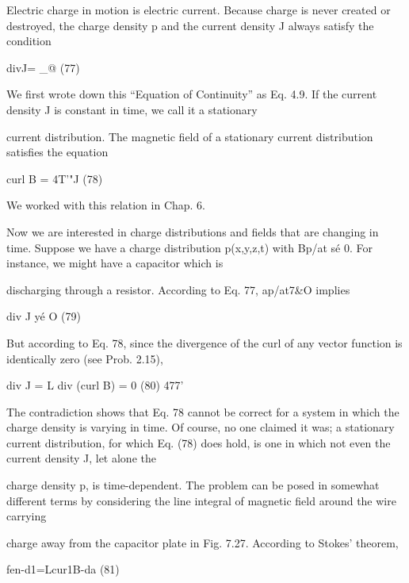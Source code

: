 Electric charge in motion is electric current. Because charge is
never created or destroyed, the charge density p and the current
density J always satisfy the condition

\begin{equation}
\end{equation}
divJ= _@ (77)

We first wrote down this ``Equation of Continuity'' as Eq. 4.9.
If the current density J is constant in time, we call it a stationary

current distribution. The magnetic field of a stationary current distribution
satisfies the equation

\begin{equation}
\end{equation}
curl B = 4T'"J (78)

We worked with this relation in Chap. 6.

Now we are interested in charge distributions and fields that are
changing in time. Suppose we have a charge distribution p(x,y,z,t)
with Bp/at sé 0. For instance, we might have a capacitor which is

discharging through a resistor. According to Eq. 77, ap/at7&O
implies

\begin{equation}
\end{equation}
div J yé O (79)

But according to Eq. 78, since the divergence of the curl of any
vector function is identically zero (see Prob. 2.15),

\begin{equation}
\end{equation}
div J = L div (curl B) = 0 (80)
477'

The contradiction shows that Eq. 78 cannot be correct for a system
in which the charge density is varying in time. Of course, no one
claimed it was; a stationary current distribution, for which Eq. (78)
does hold, is one in which not even the current density J, let alone the

charge density p, is time-dependent.
The problem can be posed in somewhat different terms by considering
the line integral of magnetic field around the wire carrying

charge away from the capacitor plate in Fig. 7.27. According to
Stokes' theorem,

\begin{equation}
\end{equation}
fen-d1=Lcur1B-da (81)

